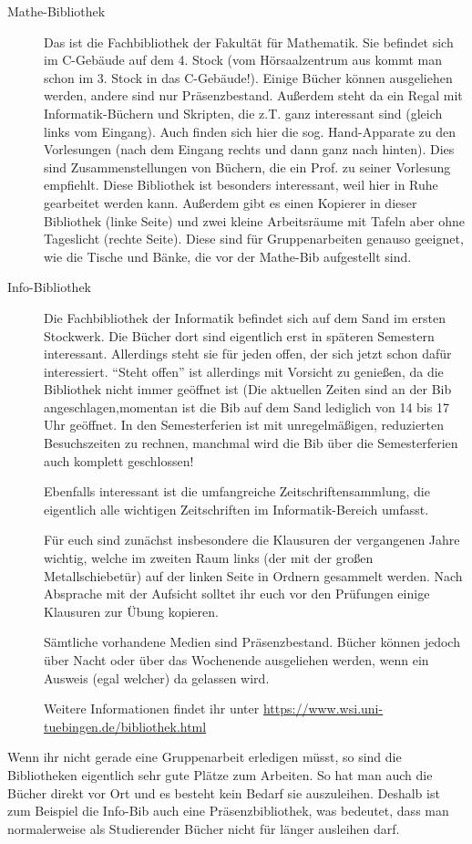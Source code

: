 \begin{description}
\item[Mathe-Bibliothek]
     Das ist die Fachbibliothek der Fakultät für Mathematik.  Sie
     befindet sich im C-Gebäude auf dem 4. Stock (vom
     Hörsaalzentrum aus kommt man schon im 3. Stock in das
     C-Gebäude!). Einige Bücher können ausgeliehen werden,
     andere sind nur Präsenzbestand.  Außerdem steht da ein Regal
     mit Informatik-Büchern und Skripten, die z.T. ganz
     interessant sind (gleich links vom Eingang).  Auch finden sich
     hier die sog. Hand-Apparate zu den Vorlesungen (nach dem
     Eingang rechts und dann ganz nach hinten).  Dies sind
     Zusammenstellungen von Büchern, die ein Prof. zu seiner
     Vorlesung empfiehlt.  Diese Bibliothek ist besonders
     interessant, weil hier in Ruhe gearbeitet werden kann.
     Außerdem gibt es einen Kopierer in dieser Bibliothek (linke
     Seite) und zwei kleine Arbeitsräume mit Tafeln aber ohne
     Tageslicht (rechte Seite).  Diese sind für Gruppenarbeiten
     genauso geeignet, wie die Tische und Bänke, die vor der
     Mathe-Bib aufgestellt sind.

\item[Info-Bibliothek]
     Die Fachbibliothek der Informatik befindet sich auf dem Sand
     im ersten Stockwerk.  Die Bücher dort sind eigentlich erst in
     späteren Semestern interessant.  Aller\-dings steht sie für jeden
     offen, der sich jetzt schon dafür interessiert.  "`Steht
     offen"' ist allerdings mit Vorsicht zu genießen, da die
     Bibliothek nicht immer geöffnet ist (Die aktuellen Zeiten
     sind an der Bib angeschlagen,momentan ist die Bib auf dem Sand lediglich von 14 bis 17 Uhr geöffnet.
     In den Semesterferien ist mit unregelmäßigen, reduzierten Besuchszeiten zu rechnen, manchmal wird die Bib über die Semesterferien auch komplett geschlossen!

     Ebenfalls interessant ist die umfangreiche Zeitschriftensammlung,
     die eigentlich alle wichtigen Zeitschriften im
     Informatik-Bereich umfasst.

     Für euch sind zunächst insbesondere die Klausuren der
     vergangenen Jahre wichtig, welche im zweiten Raum links (der mit
     der großen Metallschiebetür) auf der linken Seite in Ordnern gesammelt
     werden.  Nach Absprache mit der Aufsicht solltet ihr euch vor den
     Prüfungen einige Klausuren zur Übung kopieren.

     Sämtliche vorhandene Medien sind Präsenzbestand. Bücher können
     jedoch über Nacht oder über das Wochenende ausgeliehen werden, wenn ein Ausweis
     (egal welcher) da gelassen wird.

     Weitere Informationen findet ihr unter \url{https://www.wsi.uni-tuebingen.de/bibliothek.html}

\end{description}

Wenn ihr nicht gerade eine Gruppenarbeit erledigen müsst, so sind die
  Bibliotheken eigentlich sehr gute Plätze zum Arbeiten.  So hat man
  auch die Bücher direkt vor Ort und es besteht kein Bedarf sie
  auszuleihen.  Deshalb ist zum Beispiel die Info-Bib auch eine
  Präsenzbibliothek, was bedeutet, dass man normalerweise als
  Studierender Bücher nicht für länger ausleihen darf.
